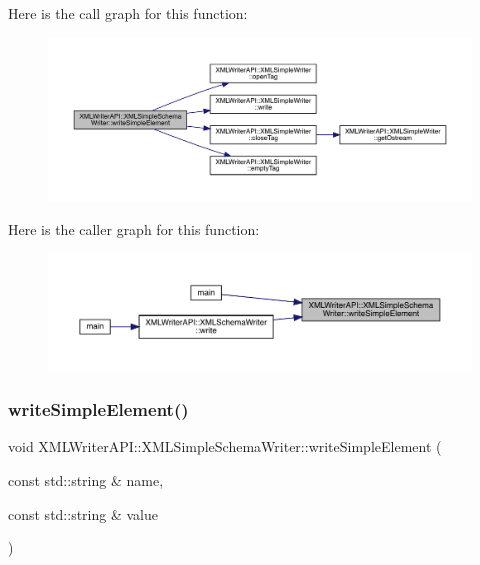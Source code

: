 Here is the call graph for this function\+:\nopagebreak
\begin{figure}[H]
\begin{center}
\leavevmode
\includegraphics[width=350pt]{db/d0b/classXMLWriterAPI_1_1XMLSimpleSchemaWriter_a312669330ac26b8849f671ea23ea60de_cgraph}
\end{center}
\end{figure}
Here is the caller graph for this function\+:
\nopagebreak
\begin{figure}[H]
\begin{center}
\leavevmode
\includegraphics[width=350pt]{db/d0b/classXMLWriterAPI_1_1XMLSimpleSchemaWriter_a312669330ac26b8849f671ea23ea60de_icgraph}
\end{center}
\end{figure}
\mbox{\label{classXMLWriterAPI_1_1XMLSimpleSchemaWriter_a312669330ac26b8849f671ea23ea60de}} 
\subsubsection{\texorpdfstring{writeSimpleElement()}{writeSimpleElement()}\hspace{0.1cm}{\footnotesize\ttfamily [2/30]}}
{\footnotesize\ttfamily void X\+M\+L\+Writer\+A\+P\+I\+::\+X\+M\+L\+Simple\+Schema\+Writer\+::write\+Simple\+Element (\begin{DoxyParamCaption}\item[{const std\+::string \&}]{name,  }\item[{const std\+::string \&}]{value }\end{DoxyParamCaption})\hspace{0.3cm}{\ttfamily [inline]}}

